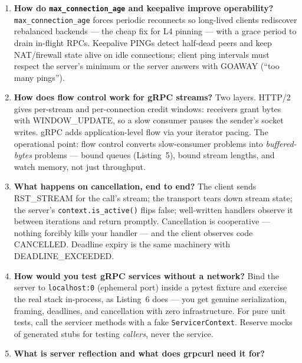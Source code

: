\begin{enumerate}[label=\textbf{Q\arabic*.}, leftmargin=1.5cm]
        LDS/CDS/RDS/EDS --- through which a control plane pushes listeners,
        clusters, routes, and endpoints to data-plane clients; gRPC's proxyless
        service-mesh mode consumes xDS natively. xDS is where the industry
        converged; grpclb is legacy context.
  \item \textbf{How do \texttt{max\_connection\_age} and keepalive improve
        operability?}
        \texttt{max\_connection\_age} forces periodic reconnects so
        long-lived clients rediscover rebalanced backends --- the cheap fix
        for L4 pinning --- with a grace period to drain in-flight RPCs.
        Keepalive PINGs detect half-dead peers and keep NAT/firewall state
        alive on idle connections; client ping intervals must respect the
        server's minimum or the server answers with GOAWAY (``too many
        pings'').
  \item \textbf{How does flow control work for gRPC streams?}
        Two layers. HTTP/2 gives per-stream and per-connection credit windows:
        receivers grant bytes with WINDOW\_UPDATE, so a slow consumer pauses
        the sender's socket writes. gRPC adds application-level flow via your
        iterator pacing. The operational point: flow control converts
        slow-consumer problems into \emph{buffered-bytes} problems --- bound
        queues (Listing~5), bound stream lengths, and watch memory, not just
        throughput.
  \item \textbf{What happens on cancellation, end to end?}
        The client sends RST\_STREAM for the call's stream; the transport
        tears down stream state; the server's \texttt{context.is\_active()}
        flips false; well-written handlers observe it between iterations and
        return promptly. Cancellation is cooperative --- nothing forcibly
        kills your handler --- and the client observes code CANCELLED. Deadline
        expiry is the same machinery with DEADLINE\_EXCEEDED.
  \item \textbf{How would you test gRPC services without a network?}
        Bind the server to \texttt{localhost:0} (ephemeral port) inside a
        pytest fixture and exercise the real stack in-process, as Listing~6
        does --- you get genuine serialization, framing, deadlines, and
        cancellation with zero infrastructure. For pure unit tests, call the
        servicer methods with a fake \texttt{ServicerContext}. Reserve mocks of
        generated stubs for testing \emph{callers}, never the service.
  \item \textbf{What is server reflection and what does grpcurl need it for?}

\end{enumerate}
